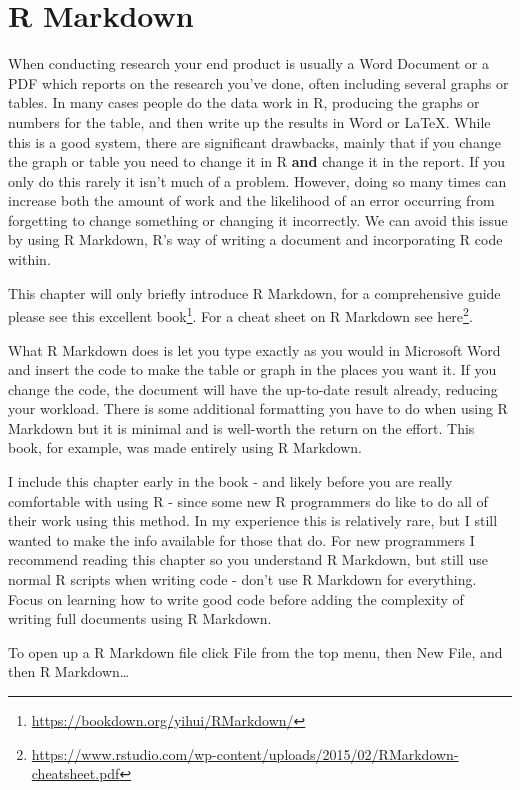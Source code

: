 \documentclass[
]{krantz}
\renewcommand{\href}[2]{#2\footnote{\url{#1}}}
\begin{document}
\hypertarget{r-markdown}{%
\chapter{R Markdown}\label{r-markdown}}

When conducting research your end product is usually a Word Document or a PDF which reports on the research you've done, often including several graphs or tables. In many cases people do the data work in R, producing the graphs or numbers for the table, and then write up the results in Word or LaTeX. While this is a good system, there are significant drawbacks, mainly that if you change the graph or table you need to change it in R \textbf{and} change it in the report. If you only do this rarely it isn't much of a problem. However, doing so many times can increase both the amount of work and the likelihood of an error occurring from forgetting to change something or changing it incorrectly. We can avoid this issue by using R Markdown, R's way of writing a document and incorporating R code within.

This chapter will only briefly introduce R Markdown, for a comprehensive guide please see \href{https://bookdown.org/yihui/RMarkdown/}{this excellent book}. For a cheat sheet on R Markdown see \href{https://www.rstudio.com/wp-content/uploads/2015/02/RMarkdown-cheatsheet.pdf}{here}.

What R Markdown does is let you type exactly as you would in Microsoft Word and insert the code to make the table or graph in the places you want it. If you change the code, the document will have the up-to-date result already, reducing your workload. There is some additional formatting you have to do when using R Markdown but it is minimal and is well-worth the return on the effort. This book, for example, was made entirely using R Markdown.

I include this chapter early in the book - and likely before you are really comfortable with using R - since some new R programmers do like to do all of their work using this method. In my experience this is relatively rare, but I still wanted to make the info available for those that do. For new programmers I recommend reading this chapter so you understand R Markdown, but still use normal R scripts when writing code - don't use R Markdown for everything. Focus on learning how to write good code before adding the complexity of writing full documents using R Markdown.

To open up a R Markdown file click File from the top menu, then New File, and then R Markdown\ldots{}
\end{document}
